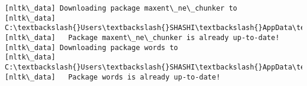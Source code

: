 \documentclass[11pt]{article}
\begin{document}
    \begin{Verbatim}[commandchars=\\\{\}]
[nltk\_data] Downloading package maxent\_ne\_chunker to
[nltk\_data]     C:\textbackslash{}Users\textbackslash{}SHASHI\textbackslash{}AppData\textbackslash{}Roaming\textbackslash{}nltk\_data{\ldots}
[nltk\_data]   Package maxent\_ne\_chunker is already up-to-date!
[nltk\_data] Downloading package words to
[nltk\_data]     C:\textbackslash{}Users\textbackslash{}SHASHI\textbackslash{}AppData\textbackslash{}Roaming\textbackslash{}nltk\_data{\ldots}
[nltk\_data]   Package words is already up-to-date!

    \end{Verbatim}


    
    
    
    
\end{document}
